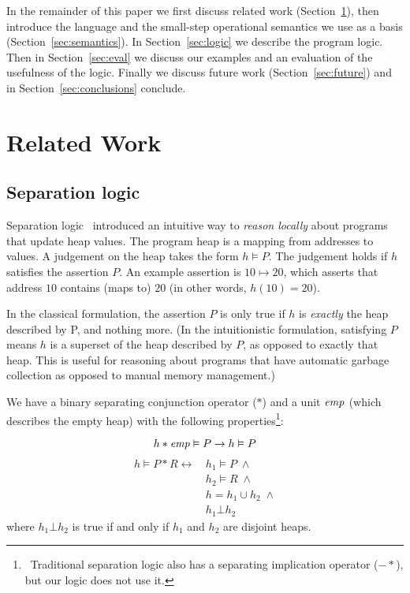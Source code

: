 In the remainder of this paper we first discuss related work
(Section~\ref{sec:relwork}), then introduce the language and the
small-step operational semantics we use as a basis (Section~\ref{sec:semantics}).
In Section~\ref{sec:logic} we describe the program logic.
Then in Section~\ref{sec:eval} we discuss our examples and an
evaluation of the usefulness of the logic.
Finally we discuss future work (Section~\ref{sec:future}) and in
Section~\ref{sec:conclusions} conclude.

\section{Related Work}
\label{sec:relwork}

\subsection{Separation logic}
Separation logic~\cite{reynolds2002separation} introduced an intuitive way to
\textit{reason locally} about programs that update heap values.
The program heap is a
mapping from addresses to values.
A judgement on the heap takes the form
$h \vDash P$.
The judgement holds if $h$ satisfies the assertion $P$.
An
example assertion is $10 \mapsto 20$, which asserts that address $10$ contains
(maps to) $20$ (in other words, $h(10) = 20$).

In the classical formulation,
the
assertion $P$ is only true if $h$ is \textit{exactly} the heap described by P,
and nothing more.
(In the intuitionistic formulation,
satisfying $P$ means $h$ is a superset of the heap described by $P$, as opposed
to exactly that heap.
This is useful for reasoning about programs that have
automatic garbage collection as opposed to manual memory management.)

We have a binary separating conjunction operator ($\ast$) and
a unit $\mathit{emp}$ (which describes the empty heap) with the following
properties\footnote{\
Traditional separation logic also has a separating implication operator
($-\!\!\ast$),
but our logic does not use it.}:

\[
    h \ast \mathit{emp} \vDash P \rightarrow h \vDash P \\
\]
\begin{align*}
    h \vDash P \ast R \leftrightarrow \, &h_1 \vDash P \; \wedge \\
		           &h_2 \vDash R \; \wedge \\
		           &h = h_1 \cup h_2 \; \wedge \\
			   &h_1 \bot h_2
\end{align*}
where $h_1 \bot h_2$ is true if and only if $h_1$ and $h_2$ are
disjoint heaps.


